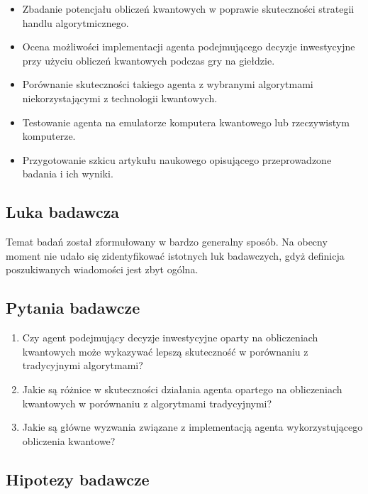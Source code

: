 \documentclass[polish,envcountsect,10pt]{article}
\begin{document}
\begin{itemize}
    \item Zbadanie potencjału obliczeń kwantowych w poprawie skuteczności strategii handlu algorytmicznego.
    \item Ocena możliwości implementacji agenta podejmującego decyzje inwestycyjne przy użyciu obliczeń kwantowych podczas gry na giełdzie.
    \item Porównanie skuteczności takiego agenta z wybranymi algorytmami niekorzystającymi z technologii kwantowych.
    \item Testowanie agenta na emulatorze komputera kwantowego lub rzeczywistym komputerze.
    \item Przygotowanie szkicu artykułu naukowego opisującego przeprowadzone badania i ich wyniki.
\end{itemize}

\subsection{Luka badawcza}

Temat badań został zformułowany w bardzo generalny sposób. Na obecny moment nie udało się zidentyfikować istotnych luk badawczych, gdyż definicja poszukiwanych wiadomości jest zbyt ogólna.

\subsection{Pytania badawcze}

\begin{enumerate}
    \item Czy agent podejmujący decyzje inwestycyjne oparty na obliczeniach kwantowych może wykazywać lepszą skuteczność w porównaniu z tradycyjnymi algorytmami?
    \item Jakie są różnice w skuteczności działania agenta opartego na obliczeniach kwantowych w porównaniu z algorytmami tradycyjnymi?
    \item Jakie są główne wyzwania związane z implementacją agenta wykorzystującego obliczenia kwantowe?
\end{enumerate}

\subsection{Hipotezy badawcze}
\end{document}
